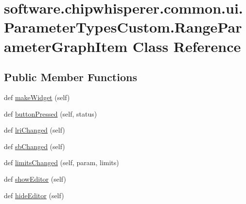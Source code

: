 \hypertarget{classsoftware_1_1chipwhisperer_1_1common_1_1ui_1_1ParameterTypesCustom_1_1RangeParameterGraphItem}{}\section{software.\+chipwhisperer.\+common.\+ui.\+Parameter\+Types\+Custom.\+Range\+Parameter\+Graph\+Item Class Reference}
\label{classsoftware_1_1chipwhisperer_1_1common_1_1ui_1_1ParameterTypesCustom_1_1RangeParameterGraphItem}
\subsection*{Public Member Functions}
\begin{DoxyCompactItemize}
\item 
def \hyperlink{classsoftware_1_1chipwhisperer_1_1common_1_1ui_1_1ParameterTypesCustom_1_1RangeParameterGraphItem_af617d079aadc29936de6a697aa3f40f4}{make\+Widget} (self)
\item 
def \hyperlink{classsoftware_1_1chipwhisperer_1_1common_1_1ui_1_1ParameterTypesCustom_1_1RangeParameterGraphItem_a2003f11d6522d4c82f21f5c8b9f245ea}{button\+Pressed} (self, status)
\item 
def \hyperlink{classsoftware_1_1chipwhisperer_1_1common_1_1ui_1_1ParameterTypesCustom_1_1RangeParameterGraphItem_a4098aab47148c79fff1575ae25bcc8ae}{lri\+Changed} (self)
\item 
def \hyperlink{classsoftware_1_1chipwhisperer_1_1common_1_1ui_1_1ParameterTypesCustom_1_1RangeParameterGraphItem_ac7ec1a4e7b8f3141a1b06c0b3642ea6d}{sb\+Changed} (self)
\item 
def \hyperlink{classsoftware_1_1chipwhisperer_1_1common_1_1ui_1_1ParameterTypesCustom_1_1RangeParameterGraphItem_a5c390bb811f2fa08bf599626dcb0756b}{limits\+Changed} (self, param, limits)
\item 
def \hyperlink{classsoftware_1_1chipwhisperer_1_1common_1_1ui_1_1ParameterTypesCustom_1_1RangeParameterGraphItem_ab2aa774a3ff977d7053e927cb29e77a1}{show\+Editor} (self)
\item 
def \hyperlink{classsoftware_1_1chipwhisperer_1_1common_1_1ui_1_1ParameterTypesCustom_1_1RangeParameterGraphItem_adbce9fbf49b92f59181782eb0ace9c2c}{hide\+Editor} (self)
\end{DoxyCompactItemize}
